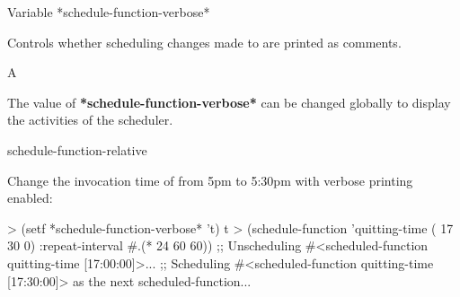 \begin{functiondoc}{Variable}%
  {*schedule-function-verbose*}{}%

\fnsyntax

\fnpurpose Controls whether scheduling changes made to
 are printed as comments. 

\fnpackage {}

\fnmodule {}

\fnvaluetype A 

\fninitialvalue \nil

\fndescription The value of \textbf{*schedule-function-verbose*} can be
changed globally to display the activities of the 
scheduler.

\begin{alsos}{schedule-function-relative}
\end{alsos}

%
\fnexample 
Change the invocation time of  
from 5pm to 5:30pm with verbose printing enabled:
\begin{example}
> (setf *schedule-function-verbose* 't)
t
> (schedule-function 'quitting-time ( 17 30 0)
    :repeat-interval #.(* 24 60 60))
;; Unscheduling #<scheduled-function quitting-time [17:00:00]>...
;; Scheduling #<scheduled-function quitting-time [17:30:00]> 
   as the next scheduled-function...
\end{example}

\end{functiondoc}


